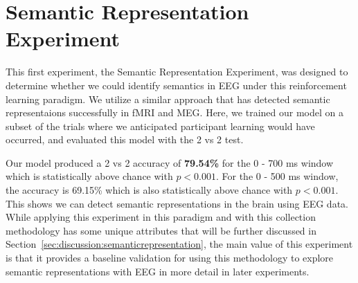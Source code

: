 \section{Semantic Representation Experiment}
This first experiment, the Semantic Representation Experiment, was designed to 
determine whether we could identify semantics in EEG under this reinforcement 
learning paradigm. We utilize a similar approach that has detected semantic 
representaions successfully in fMRI and MEG. Here, we trained our model on a 
subset of the trials where we anticipated participant learning would have 
occurred, and evaluated this model with the 2 vs 2 test. 

Our model produced a 2 vs 2 accuracy of \textbf{79.54\%} for the 0 - 700 ms 
window which is statistically above chance with $p < 0.001$. For the 0 - 500 ms 
window, the \tvt accuracy is 69.15\% which is also statistically above chance 
with $p < 0.001$. This shows we can detect semantic representations in the 
brain using EEG data.  While applying this experiment in this paradigm and with 
this collection methodology has some unique attributes that will be further 
discussed in Section~\ref{sec:discussion:semanticrepresentation}, the main 
value of this experiment is that it provides a baseline validation for using 
this methodology to explore semantic representations with EEG in more detail in 
later experiments. 
